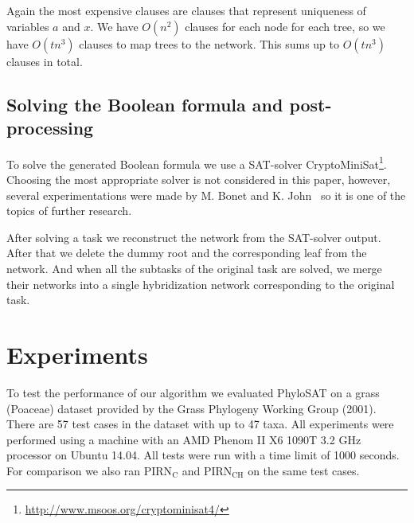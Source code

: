 \documentclass[runningheads, envcountsame, a4paper]{llncs}
\begin{document}
Again the most expensive clauses are clauses that represent uniqueness of variables $a$ and $x$. We have $O(n^2)$ clauses for
each node for each tree, so we have $O(tn^3)$ clauses to map trees to the network. This sums up to $O(tn^3)$ clauses in total.

\subsection{Solving the Boolean formula and post-processing}

To solve the generated Boolean formula we use a SAT-solver CryptoMiniSat\footnote{\url{http://www.msoos.org/cryptominisat4/}}.
Choosing the most appropriate solver is not considered in this paper, however, several experimentations were made by 
M. Bonet and K. John~\cite{bonet2009efficiently} so it is one of the topics of further research.

After solving a task we reconstruct the network from the SAT-solver output. After that we delete the dummy root and the corresponding 
leaf from the network. And when all the subtasks of the original task are solved, we merge their networks into a single 
hybridization network corresponding to the original task.

\section{Experiments}

To test the performance of our algorithm we evaluated PhyloSAT on a grass (Poaceae) dataset provided by the Grass Phylogeny Working Group (2001). There are 57 test cases in the dataset with up to 47 taxa. All experiments were performed using a machine with an AMD Phenom II X6 1090T 3.2 GHz 
processor on Ubuntu 14.04. All tests were run with a time limit of 1000 seconds. For comparison we also ran PIRN$\mathrm{_C}$ and PIRN$\mathrm{_{CH}}$ 
on the same test cases. 
\end{document}
